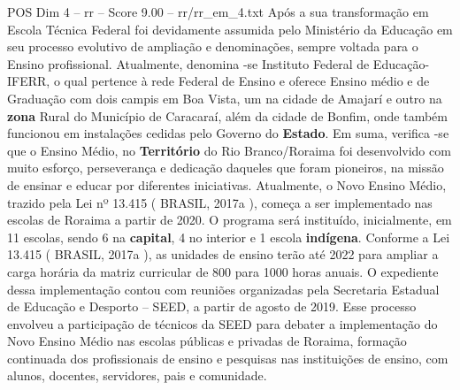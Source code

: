 \begin{textsample}{POS Dim 4 – rr – Score 9.00 – rr/rr\_em\_4.txt}
Após a sua transformação em Escola Técnica Federal foi devidamente assumida pelo Ministério da Educação em seu processo evolutivo de ampliação e denominações, sempre voltada para o Ensino profissional.
Atualmente, denomina -se Instituto Federal de Educação- IFERR, o qual pertence à rede Federal de Ensino e oferece Ensino médio e de Graduação com dois campis em Boa Vista, um na cidade de Amajarí e outro na \textbf{zona} Rural do Município de Caracaraí, além da cidade de Bonfim, onde também funcionou em instalações cedidas pelo Governo do \textbf{Estado}.
Em suma, verifica -se que o Ensino Médio, no \textbf{Território} do Rio Branco/Roraima foi desenvolvido com muito esforço, perseverança e dedicação daqueles que foram pioneiros, na missão de ensinar e educar por diferentes iniciativas.
Atualmente, o Novo Ensino Médio, trazido pela Lei nº 13.415 ( BRASIL, 2017a ), começa a ser implementado nas escolas de Roraima a partir de 2020.
O programa será instituído, inicialmente, em 11 escolas, sendo 6 na \textbf{capital}, 4 no interior e 1 escola \textbf{indígena}.
Conforme a Lei 13.415 ( BRASIL, 2017a ), as unidades de ensino terão até 2022 para ampliar a carga horária da matriz curricular de 800 para 1000 horas anuais.
O expediente dessa implementação contou com reuniões organizadas pela Secretaria Estadual de Educação e Desporto – SEED, a partir de agosto de 2019.
Esse processo envolveu a participação de técnicos da SEED para debater a implementação do Novo Ensino Médio nas escolas públicas e privadas de Roraima, formação continuada dos profissionais de ensino e pesquisas nas instituições de ensino, com alunos, docentes, servidores, pais e comunidade.

\end{textsample}
